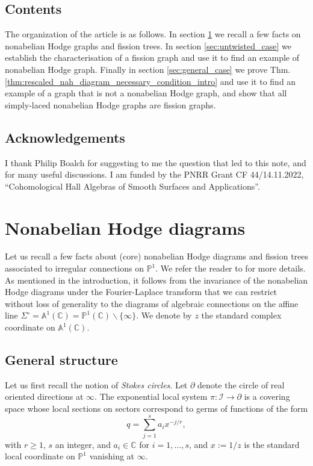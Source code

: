 \documentclass[11pt,a4paper]{amsart}
\numberwithin{equation}{section}
\begin{document}
\subsection{Contents} The organization of the article is as follows. In section \ref{sec:nonabelian_Hodge_diag} we recall a few facts on nonabelian Hodge graphs and fission trees. In section \ref{sec:untwisted_case} we establish the characterisation of a fission graph and use it to find an example of nonabelian Hodge graph. Finally in section \ref{sec:general_case} we prove Thm. \ref{thm:rescaled_nah_diagram_necessary_condition_intro} and use it to find an example of a graph that is not a nonabelian Hodge graph, and show that all simply-laced nonabelian Hodge graphs are fission graphs. 

\subsection*{Acknowledgements} I thank Philip Boalch for suggesting to me the question that led to this note, and for many useful discussions. I am funded by the PNRR Grant CF 44/14.11.2022, ``Cohomological Hall Algebras of Smooth Surfaces and Applications''. 

\section{Nonabelian Hodge diagrams}
\label{sec:nonabelian_Hodge_diag}


Let us recall a few facts about (core) nonabelian Hodge diagrams and fission trees associated to irregular connections on $\mathbb P^1$. We refer the reader to \cite{doucot2021diagrams, boalch2025twisted} for more details. As mentioned in the introduction, it follows from the invariance of the nonabelian Hodge diagrams under the Fourier-Laplace transform that we can restrict without loss of generality to the diagrams of algebraic connections on the affine line $\Sigma^\circ=\mathbb A^1(\mathbb C)=\mathbb P^1(\mathbb C)\smallsetminus \{\infty\}$. We denote by $z$ the standard complex coordinate on $\mathbb A^1(\mathbb C)$.

\subsection{General structure}

Let us first recall the notion of \emph{Stokes circles}. Let $\partial$ denote the circle of real oriented directions at $\infty$. The exponential local system $\pi:\mathcal I\to\partial$ is a covering space whose local sections on sectors correspond to germs of functions of the form
\begin{equation}
\label{eq:exponential_factor}
q=\sum_{j=1}^s a_i x^{-j/r},
\end{equation}
with $r\geq 1$, $s$ an integer, and $a_i\in \mathbb C$ for $i=1,\dots, s$, and $x:=1/z$ is the standard local coordinate on $\mathbb P^1$ vanishing at $\infty$.
\end{document}
